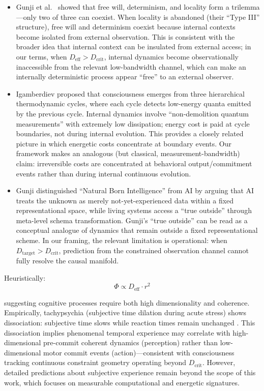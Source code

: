 \documentclass[12pt]{article}
\begin{document}
\begin{itemize}
\item Gunji et al.\ \cite{gunji2020} showed that free will, determinism, and locality form a trilemma---only two of three can coexist. When locality is abandoned (their ``Type III'' structure), free will and determinism coexist because internal contexts become isolated from external observation. This is consistent with the broader idea that internal context can be insulated from external access; in our terms, when $D_{\text{eff}} > D_{\text{crit}}$, internal dynamics become observationally inaccessible from the relevant low-bandwidth channel, which can make an internally deterministic process appear ``free'' to an external observer.

\item Igamberdiev \cite{igamberdiev2024} proposed that consciousness emerges from three hierarchical thermodynamic cycles, where each cycle detects low-energy quanta emitted by the previous cycle. Internal dynamics involve ``non-demolition quantum measurements'' with extremely low dissipation; energy cost is paid at cycle boundaries, not during internal evolution. This provides a closely related picture in which energetic costs concentrate at boundary events. Our framework makes an analogous (but classical, measurement-bandwidth) claim: irreversible costs are concentrated at behavioral output/commitment events rather than during internal continuous evolution.

\item Gunji \cite{gunji2025} distinguished ``Natural Born Intelligence'' from AI by arguing that AI treats the unknown as merely not-yet-experienced data within a fixed representational space, while living systems access a ``true outside'' through meta-level schema transformation. Gunji's ``true outside'' can be read as a conceptual analogue of dynamics that remain outside a fixed representational scheme. In our framing, the relevant limitation is operational: when $D_{\text{target}} > D_{\text{crit}}$, prediction from the constrained observation channel cannot fully resolve the causal manifold.
\end{itemize}

\noindent Heuristically:
\begin{equation}
\Phi \propto D_{\text{eff}} \cdot r^2
\end{equation}

suggesting cognitive processes require both high dimensionality and coherence. Empirically, tachypsychia (subjective time dilation during acute stress) shows dissociation: subjective time slows while reaction times remain unchanged \cite{stetson2007}. This dissociation implies phenomenal temporal experience may correlate with high-dimensional pre-commit coherent dynamics (perception) rather than low-dimensional motor commit events (action)---consistent with consciousness tracking continuous constraint geometry operating beyond $D_{\text{crit}}$. However, detailed predictions about subjective experience remain beyond the scope of this work, which focuses on measurable computational and energetic signatures.
\end{document}
